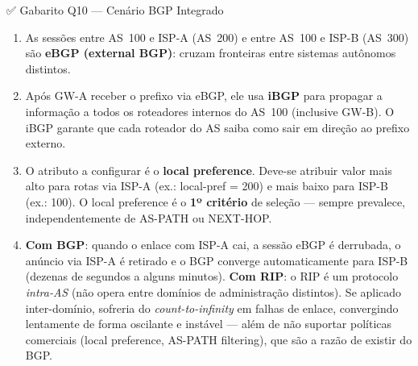 \documentclass[11pt,a4paper]{article}
\begin{document}
\begin{gabaritocaixa}{✅ Gabarito Q10 --- Cenário BGP Integrado}
\begin{enumerate}[label=(\alph*)]
    \item As sessões entre AS~100 e ISP-A (AS~200) e entre AS~100 e ISP-B (AS~300) são \textbf{eBGP (external BGP)}: cruzam fronteiras entre sistemas autônomos distintos.
    \item Após GW-A receber o prefixo via eBGP, ele usa \textbf{iBGP} para propagar a informação a todos os roteadores internos do AS~100 (inclusive GW-B). O iBGP garante que cada roteador do AS saiba como sair em direção ao prefixo externo.
    \item O atributo a configurar é o \textbf{local preference}. Deve-se atribuir valor mais alto para rotas via ISP-A (ex.: local-pref = 200) e mais baixo para ISP-B (ex.: 100). O local preference é o \textbf{1º critério} de seleção --- sempre prevalece, independentemente de AS-PATH ou NEXT-HOP.
    \item \textbf{Com BGP}: quando o enlace com ISP-A cai, a sessão eBGP é derrubada, o anúncio via ISP-A é retirado e o BGP converge automaticamente para ISP-B (dezenas de segundos a alguns minutos). \textbf{Com RIP}: o RIP é um protocolo \emph{intra-AS} (não opera entre domínios de administração distintos). Se aplicado inter-domínio, sofreria do \textit{count-to-infinity} em falhas de enlace, convergindo lentamente de forma oscilante e instável --- além de não suportar políticas comerciais (local preference, AS-PATH filtering), que são a razão de existir do BGP.
\end{enumerate}
\end{gabaritocaixa}
\end{document}
